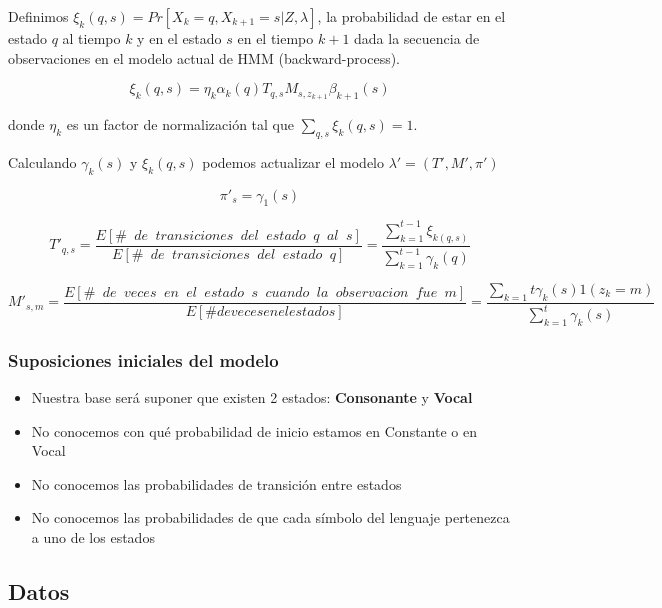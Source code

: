 \documentclass[]{article}
\begin{document}
Definimos $\xi_{k}(q,s)=Pr[X_{k}=q,X_{k+1}=s|Z,\lambda]$, la
probabilidad de estar en el estado $q$ al tiempo $k$ y en el estado $s$
en el tiempo $k+1$ dada la secuencia de observaciones en el modelo
actual de HMM (backward-process).

\[
\xi_{k}(q,s)=\eta_{k}\alpha_{k}(q)T_{q,s}M_{s,z_{k+1}}\beta_{k+1}(s)
\]

donde $\eta_{k}$ es un factor de normalización tal que
$\sum_{q,s}\xi_{k}(q,s)=1$.

Calculando $\gamma_{k}(s)$ y $\xi_{k}(q,s)$ podemos actualizar el modelo
$\lambda'=(T',M',\pi')$

\[
\pi'_{s}=\gamma_{1}(s)
\]

\[
T'_{q,s}=\frac{E[\#\phantom{a}de\phantom{a}transiciones\phantom{a}del\phantom{a}estado\phantom{a}q \phantom{a}al\phantom{a}s]}{E[\#\phantom{a}de\phantom{a}transiciones\phantom{a}del\phantom{a}estado\phantom{a}q]}=\frac{\sum_{k=1}^{t-1}\xi_{k(q,s)}}{\sum_{k=1}^{t-1}\gamma_{k}(q)}
\]

\[
M'_{s,m}=\frac{E[\#\phantom{a}de\phantom{a}veces\phantom{a}en\phantom{a}el\phantom{a}estado\phantom{a}s\phantom{a}cuando\phantom{a}la\phantom{a}observacion\phantom{a}fue\phantom{a}m]}{E[\# de veces en el estado s]}=\frac{\sum_{k=1}{t}\gamma_{k}(s)1(z_{k}=m)}{\sum_{k=1}^{t}\gamma_{k}(s)}
\]

\subsubsection{Suposiciones iniciales del
modelo}\label{suposiciones-iniciales-del-modelo}

\begin{itemize}
\itemsep1pt\parskip0pt
\item
  Nuestra base será suponer que existen 2 estados: \textbf{Consonante} y
  \textbf{Vocal}\\
\item
  No conocemos con qué probabilidad de inicio estamos en Constante o en
  Vocal
\item
  No conocemos las probabilidades de transición entre estados
\item
  No conocemos las probabilidades de que cada símbolo del lenguaje
  pertenezca a uno de los estados
\end{itemize}

\subsection{Datos}\label{datos}
\end{document}
